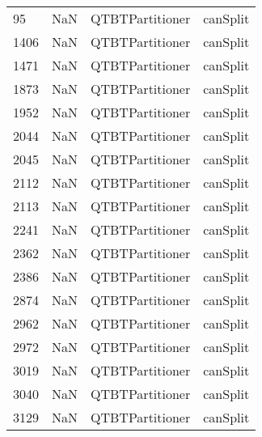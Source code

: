 \begin{tabular}{llll}
95   &                   NaN &            QTBTPartitioner &                                  canSplit \\
1406 &                   NaN &            QTBTPartitioner &                                  canSplit \\
1471 &                   NaN &            QTBTPartitioner &                                  canSplit \\
1873 &                   NaN &            QTBTPartitioner &                                  canSplit \\
1952 &                   NaN &            QTBTPartitioner &                                  canSplit \\
2044 &                   NaN &            QTBTPartitioner &                                  canSplit \\
2045 &                   NaN &            QTBTPartitioner &                                  canSplit \\
2112 &                   NaN &            QTBTPartitioner &                                  canSplit \\
2113 &                   NaN &            QTBTPartitioner &                                  canSplit \\
2241 &                   NaN &            QTBTPartitioner &                                  canSplit \\
2362 &                   NaN &            QTBTPartitioner &                                  canSplit \\
2386 &                   NaN &            QTBTPartitioner &                                  canSplit \\
2874 &                   NaN &            QTBTPartitioner &                                  canSplit \\
2962 &                   NaN &            QTBTPartitioner &                                  canSplit \\
2972 &                   NaN &            QTBTPartitioner &                                  canSplit \\
3019 &                   NaN &            QTBTPartitioner &                                  canSplit \\
3040 &                   NaN &            QTBTPartitioner &                                  canSplit \\
3129 &                   NaN &            QTBTPartitioner &                                  canSplit \\

\end{tabular}

